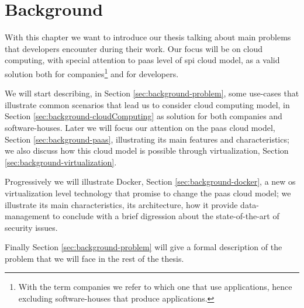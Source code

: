 %
%
\chapter{Background}
\label{cap:background}
With this chapter we want to introduce our thesis talking about main problems that developers
encounter during their work. Our focus will be on cloud computing, with special
attention to \ac{paas} level of \ac{spi} cloud model, as a valid solution both for
companies\footnote{With the term companies we refer to which one that use applications, hence
excluding software-houses that produce applications.} and for developers.

We will start describing, in Section \ref{sec:background-problem}, some use-cases that illustrate
common scenarios that lead us to consider cloud computing model, in Section 
\ref{sec:background-cloudComputing} as solution for both companies and software-houses.
Later we will focus our attention on the \ac{paas} cloud model, Section \ref{sec:background-paas}, 
illustrating its main features and characteristics; we also discuss how this cloud model is possible
through virtualization, Section \ref{sec:background-virtualization}.

Progressively we will illustrate Docker, Section \ref{sec:background-docker}, a new \acs{os}
virtualization level technology that promise to change the \ac{paas} cloud model; we illustrate its
main characteristics, its architecture, how it provide data-management to conclude with a brief digression
about the state-of-the-art of security issues.

Finally Section \ref{sec:background-problem} will give a formal description of the problem that we
will face in the rest of the thesis.









